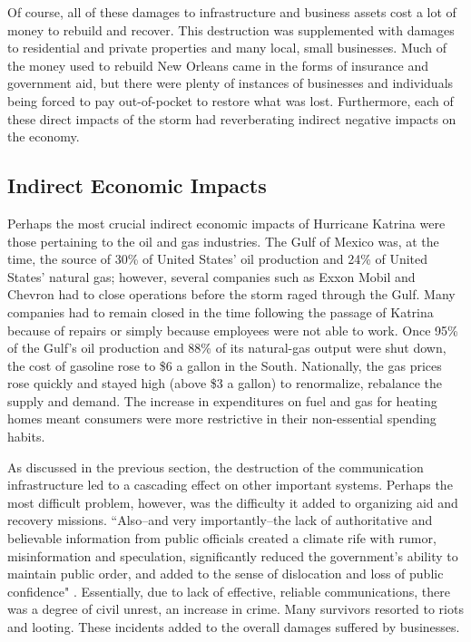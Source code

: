 \documentclass[%
 reprint,
 amsmath,amssymb,
 aps,
]{revtex4-1}
\begin{document}
Of course, all of these damages to infrastructure and business assets cost a lot of money to rebuild and recover. This destruction was supplemented with damages to residential and private properties and many local, small businesses. Much of the money used to rebuild New Orleans came in the forms of insurance and government aid, but there were plenty of instances of businesses and individuals being forced to pay out-of-pocket to restore what was lost. Furthermore, each of these direct impacts of the storm had reverberating indirect negative impacts on the economy. 

\subsection{\label{sec:level2} Indirect Economic Impacts}

Perhaps the most crucial indirect economic impacts of Hurricane Katrina were those pertaining to the oil and gas industries. The Gulf of Mexico was, at the time, the source of 30\% of United States' oil production and 24\% of United States' natural gas; however, several companies such as Exxon Mobil and Chevron had to close operations before the storm raged through the Gulf. \cite{laverty_2005} Many companies had to remain closed in the time following the passage of Katrina because of repairs or simply because employees were not able to work. Once 95\% of the Gulf's oil production and 88\% of its natural-gas output were shut down, the cost of gasoline rose to \$6 a gallon in the South. Nationally, the gas prices rose quickly and stayed high (above \$3 a gallon) to renormalize, rebalance the supply and demand. The increase in expenditures on fuel and gas for heating homes meant consumers were more restrictive in their non-essential spending habits. \cite{samuelson_2005} 

As discussed in the previous section, the destruction of the communication infrastructure led to a cascading effect on other important systems. Perhaps the most difficult problem, however, was the difficulty it added to organizing aid and recovery missions. ``Also--and very importantly--the lack of authoritative and believable information from public officials created a climate rife with rumor, misinformation and speculation, significantly reduced the government's ability to maintain public order, and added to the sense of dislocation and loss of public confidence" \cite{MillerPaper}. Essentially, due to lack of effective, reliable communications, there was a degree of civil unrest, an increase in crime. Many survivors resorted to riots and looting. These incidents added to the overall damages suffered by businesses.
\end{document}
